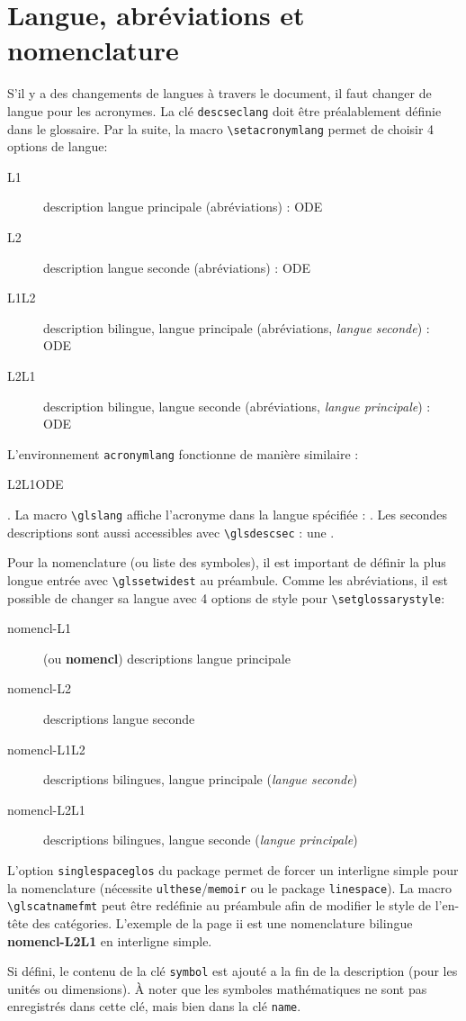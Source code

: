 \documentclass[projet,nohyperref,english,french]{ulthese}
\begin{document}
\section{Langue, abréviations et nomenclature}

S'il y a des changements de langues à travers le document, il faut changer de langue pour les acronymes. La clé \texttt{descseclang} doit être préalablement définie dans le glossaire. Par la suite, la macro \texttt{\textbackslash setacronymlang} permet de choisir 4 options de langue: 
\begin{description}
	\item[L1] description langue principale (abréviations) : \acrfull{ODE}
	\item[L2] description langue seconde (abréviations) : \acrfull{ODE}
	\item[L1L2] description bilingue, langue principale (abréviations, \textit{langue seconde}) : \acrfull{ODE}
	\item[L2L1] description bilingue, langue seconde (abréviations, \textit{langue principale}) : \acrfull{ODE}
\end{description}
L'environnement \texttt{acronymlang} fonctionne de manière similaire : \begin{acronymlang}{L2L1}\acrfull{ODE}\end{acronymlang}. La macro \texttt{\textbackslash glslang} affiche l'acronyme dans la langue spécifiée : . Les secondes descriptions sont aussi accessibles avec \texttt{\textbackslash glsdescsec} : une .

Pour la nomenclature (ou liste des symboles), il est important de définir la plus longue entrée avec \texttt{\textbackslash glssetwidest} au préambule.
Comme les abréviations, il est possible de changer sa langue avec 4 options de style pour \texttt{\textbackslash setglossarystyle}:
\begin{description}
	\item[nomencl-L1] (ou \textbf{nomencl}) descriptions langue principale
	\item[nomencl-L2] descriptions langue seconde
	\item[nomencl-L1L2] descriptions bilingues, langue principale (\textit{langue seconde})
	\item[nomencl-L2L1] descriptions bilingues, langue seconde (\textit{langue principale})
\end{description}
L'option \texttt{singlespaceglos} du package permet de forcer un interligne simple pour la nomenclature (nécessite \texttt{ulthese}/\texttt{memoir} ou le package \texttt{linespace}). La macro \texttt{\textbackslash glscatnamefmt} peut être redéfinie au préambule afin de modifier le style de l'en-tête des catégories. L'exemple de la page ii est une nomenclature bilingue \textbf{nomencl-L2L1} en interligne simple.

Si défini, le contenu de la clé \texttt{symbol} est ajouté a la fin de la description (pour les unités ou dimensions). À noter que les symboles mathématiques ne sont pas enregistrés dans cette clé, mais bien dans la clé \texttt{name}.
\end{document}
